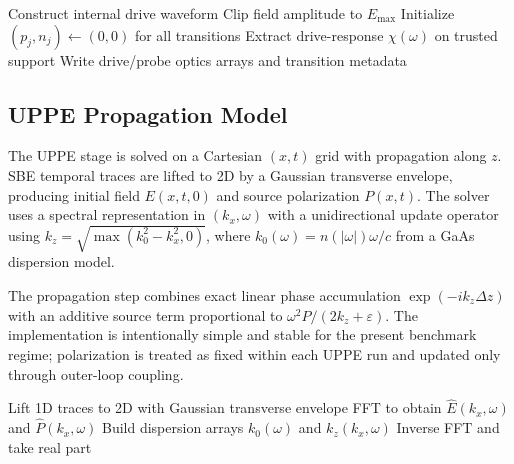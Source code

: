 \documentclass[aps,pra,twocolumn,reprint,superscriptaddress,nofootinbib]{revtex4-2}
\begin{document}
\begin{algorithm}[t]
\caption{SBE solve with drive/probe optical extraction}
Construct internal drive waveform\;
Clip field amplitude to $E_{\max}$\;
Initialize $(p_j,n_j)\leftarrow(0,0)$ for all transitions\;
Extract drive-response $\chi(\omega)$ on trusted support\;
Write drive/probe optics arrays and transition metadata\;
\end{algorithm}

\subsection{UPPE Propagation Model}
The UPPE stage is solved on a Cartesian $(x,t)$ grid with propagation along
$z$. SBE temporal traces are lifted to 2D by a Gaussian transverse envelope,
producing initial field $E(x,t,0)$ and source polarization $P(x,t)$. The solver
uses a spectral representation in $(k_x,\omega)$ with a unidirectional update
operator using $k_z=\sqrt{\max(k_0^2-k_x^2,0)}$, where
$k_0(\omega)=n(|\omega|)\omega/c$ from a GaAs dispersion model.

The propagation step combines exact linear phase accumulation
$\exp(-ik_z\Delta z)$ with an additive source term proportional to
$\omega^2\hat{P}/(2k_z+\varepsilon)$. The implementation is intentionally simple
and stable for the present benchmark regime; polarization is treated as fixed
within each UPPE run and updated only through outer-loop coupling.

\begin{algorithm}[t]
\caption{UPPE propagation in $(k_x,\omega)$ domain}
Lift 1D traces to 2D with Gaussian transverse envelope\;
FFT to obtain $\hat{E}(k_x,\omega)$ and $\hat{P}(k_x,\omega)$\;
Build dispersion arrays $k_0(\omega)$ and $k_z(k_x,\omega)$\;
Inverse FFT and take real part\;
\end{algorithm}
\end{document}
